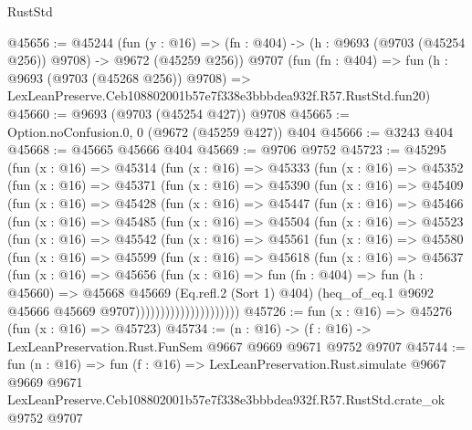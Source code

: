 \begin{lexlean}{RustStd}
\begin{coremodule}
@45656 := @45244
    (fun (y : @16) => (fn : @404) -> (h : @9693 (@9703 (@45254 @256)) @9708) -> @9672 (@45259 @256))
    @9707
    (fun (fn : @404) =>
    fun (h : @9693 (@9703 (@45268 @256)) @9708) =>
    LexLeanPreserve.Ceb108802001b57e7f338e3bbbdea932f.R57.RustStd.fun20)
@45660 := @9693 (@9703 (@45254 @427)) @9708
@45665 := Option.noConfusion.{0, 0} (@9672 (@45259 @427)) @404
@45666 := @3243 @404
@45668 := @45665 @45666 @404
@45669 := @9706 @9752
@45723 := @45295
    (fun (x : @16) =>
    @45314
      (fun (x : @16) =>
      @45333
        (fun (x : @16) =>
        @45352
          (fun (x : @16) =>
          @45371
            (fun (x : @16) =>
            @45390
              (fun (x : @16) =>
              @45409
                (fun (x : @16) =>
                @45428
                  (fun (x : @16) =>
                  @45447
                    (fun (x : @16) =>
                    @45466
                      (fun (x : @16) =>
                      @45485
                        (fun (x : @16) =>
                        @45504
                          (fun (x : @16) =>
                          @45523
                            (fun (x : @16) =>
                            @45542
                              (fun (x : @16) =>
                              @45561
                                (fun (x : @16) =>
                                @45580
                                  (fun (x : @16) =>
                                  @45599
                                    (fun (x : @16) =>
                                    @45618
                                      (fun (x : @16) =>
                                      @45637
                                        (fun (x : @16) =>
                                        @45656
                                          (fun (x : @16) =>
                                          fun (fn : @404) =>
                                          fun (h : @45660) =>
                                          @45668
                                            @45669
                                            (Eq.refl.{2} (Sort 1) @404)
                                            (heq_of_eq.{1}
                                              @9692
                                              @45666
                                              @45669
                                              @9707)))))))))))))))))))))
@45726 := fun (x : @16) => @45276 (fun (x : @16) => @45723)
@45734 := (n : @16) -> (f : @16) -> LexLeanPreservation.Rust.FunSem @9667 @9669 @9671 @9752 @9707
@45744 := fun (n : @16) =>
  fun (f : @16) =>
  LexLeanPreservation.Rust.simulate
    @9667
    @9669
    @9671
    LexLeanPreserve.Ceb108802001b57e7f338e3bbbdea932f.R57.RustStd.crate_ok
    @9752
    @9707
\end{coremodule}
\end{lexlean}
